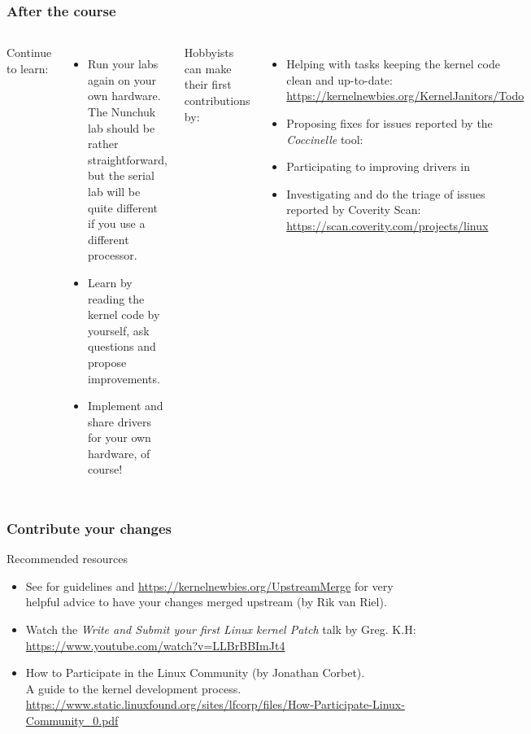 \begin{frame}
  \frametitle{After the course}
  \begin{columns}
  Continue to learn:
  \begin{itemize}
  \item Run your labs again on your own hardware. The Nunchuk lab should
        be rather straightforward, but the serial lab will be quite different
	if you use a different processor.
  \item Learn by reading the kernel code by yourself, ask questions and
	propose improvements.
  \item Implement and share drivers for your own hardware, of course!
  \end{itemize}
  Hobbyists can make their first contributions by:
  \begin{itemize}
  \item Helping with tasks keeping the kernel code clean and up-to-date:\\
	\url{https://kernelnewbies.org/KernelJanitors/Todo}
  \item Proposing fixes for issues reported by the {\em Coccinelle} tool:\\
  \item Participating to improving drivers in 
  \item Investigating and do the triage of issues reported by Coverity Scan:
        \url{https://scan.coverity.com/projects/linux}
  \end{itemize}
  \end{columns}
\end{frame}

\begin{frame}
  \frametitle{Contribute your changes}
  \small
  Recommended resources
  \begin{itemize}
  \item See  for guidelines
    and \url{https://kernelnewbies.org/UpstreamMerge} for very
    helpful advice to have your changes merged upstream (by Rik van
    Riel).
  \item Watch the \emph{Write and Submit your first Linux kernel
      Patch} talk by Greg. K.H:
    \url{https://www.youtube.com/watch?v=LLBrBBImJt4}
  \item How to Participate in the Linux Community (by Jonathan Corbet).\\
    A guide to the kernel development process.
    {\scriptsize \url{https://www.static.linuxfound.org/sites/lfcorp/files/How-Participate-Linux-Community_0.pdf}}
  \end{itemize}
\end{frame}
